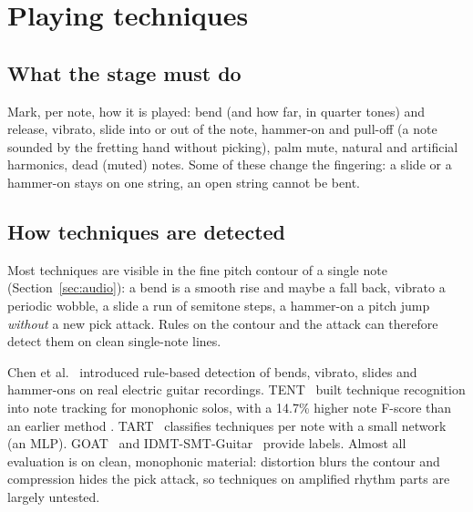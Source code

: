\section{Playing techniques}
\label{sec:techniques}

\subsection{What the stage must do}

Mark, per note, how it is played: bend (and how far, in quarter tones) and
release, vibrato, slide into or out of the note, hammer-on and pull-off (a note
sounded by the fretting hand without picking), palm mute, natural and
artificial harmonics, dead (muted) notes. Some of these change the fingering:
a slide or a hammer-on stays on one string, an open string cannot be bent.

\subsection{How techniques are detected}

\begin{keyidea}
Most techniques are visible in the fine pitch contour of a single note
(Section~\ref{sec:audio}): a bend is a smooth rise and maybe a fall back, vibrato
a periodic wobble, a slide a run of semitone steps, a hammer-on a pitch jump
\emph{without} a new pick attack. Rules on the contour and the attack can
therefore detect them on clean single-note lines.
\end{keyidea}

Chen et al.~\cite{chen2015technique} introduced rule-based detection of bends,
vibrato, slides and hammer-ons on real electric guitar recordings.
TENT~\cite{su2019tent} built technique recognition into note tracking for
monophonic solos, with a 14.7\% higher note F-score than an earlier method
\reported. TART~\cite{gupta2026tart} classifies techniques per note with a small
network (an MLP). GOAT~\cite{loth2025goat} and IDMT-SMT-Guitar~\cite{kehling2014idmt}
provide labels. Almost all evaluation is on clean, monophonic material: distortion
blurs the contour and compression hides the pick attack, so techniques on
amplified rhythm parts are largely untested.

